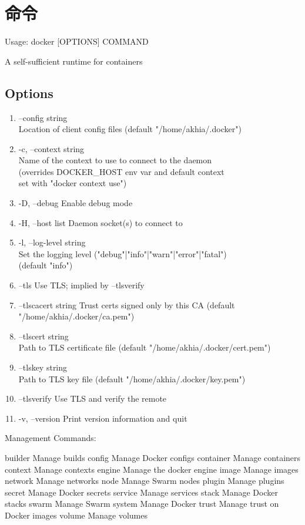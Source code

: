 \chapter{命令}
\newpage

Usage:  docker [OPTIONS] COMMAND

A self-sufficient runtime for containers

\section{Options}

\begin{enumerate}
\item --config string\\
    Location of client config files (default "/home/akhia/.docker")
\item -c, --context string\\
    Name of the context to use to connect to the daemon \\
    (overrides DOCKER\_HOST env var and default context \\
    set with "docker context use")
\item -D, --debug
    Enable debug mode
\item -H, --host list
    Daemon socket(s) to connect to
\item -l, --log-level string\\
    Set the logging level ("debug"|"info"|"warn"|"error"|"fatal") \\
    (default "info")
\item --tls
    Use TLS; implied by --tlsverify
\item --tlscacert string
    Trust certs signed only by this CA (default "/home/akhia/.docker/ca.pem")
\item --tlscert string\\
    Path to TLS certificate file (default "/home/akhia/.docker/cert.pem")
\item --tlskey string\\
    Path to TLS key file (default "/home/akhia/.docker/key.pem")
\item --tlsverify
    Use TLS and verify the remote
\item -v, --version
    Print version information and quit
\end{enumerate}

\newpage

Management Commands:

builder     Manage builds
config      Manage Docker configs
container   Manage containers
context     Manage contexts
engine      Manage the docker engine
image       Manage images
network     Manage networks
node        Manage Swarm nodes
plugin      Manage plugins
secret      Manage Docker secrets
service     Manage services
stack       Manage Docker stacks
swarm       Manage Swarm
system      Manage Docker
trust       Manage trust on Docker images
volume      Manage volumes

